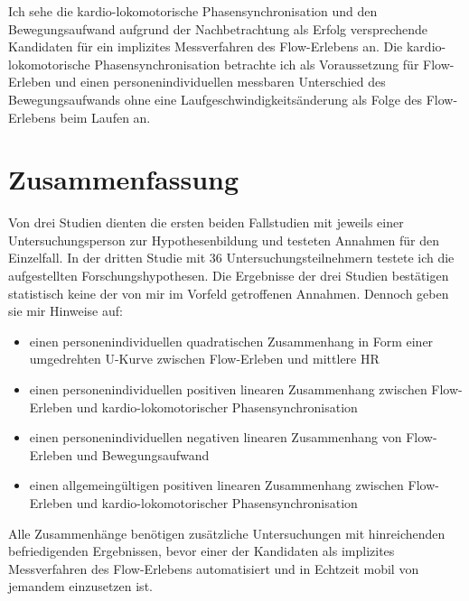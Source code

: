 Ich sehe die kardio-lokomotorische Phasensynchronisation und den Bewegungsaufwand aufgrund der Nachbetrachtung als Erfolg versprechende Kandidaten für ein implizites Messverfahren des Flow-Erlebens an. Die kardio-lokomotorische Phasensynchronisation betrachte ich als Voraussetzung für Flow-Erleben und einen personenindividuellen messbaren Unterschied des Bewegungsaufwands ohne eine Laufgeschwindigkeitsänderung als Folge des Flow-Erlebens beim Laufen an. 

\section{Zusammenfassung}
\label{sec:zusammenfassung_5}

Von drei Studien dienten die ersten beiden Fallstudien mit jeweils einer Untersuchungsperson zur Hypothesenbildung und testeten Annahmen für den Einzelfall. In der dritten Studie mit 36 Untersuchungsteilnehmern testete ich die aufgestellten Forschungshypothesen. Die Ergebnisse der drei Studien bestätigen statistisch keine der von mir im Vorfeld getroffenen Annahmen. Dennoch geben sie mir Hinweise auf:

\begin{itemize}
	\item einen personenindividuellen quadratischen Zusammenhang in Form einer umgedrehten U-Kurve zwischen Flow-Erleben und mittlere HR
	\item einen personenindividuellen positiven linearen Zusammenhang zwischen Flow-Erleben und kardio-lokomotorischer Phasensynchronisation
	\item einen personenindividuellen negativen linearen Zusammenhang von Flow-Erleben und Bewegungsaufwand
	\item einen allgemeingültigen positiven linearen Zusammenhang zwischen Flow-Erleben und kardio-lokomotorischer Phasensynchronisation
\end{itemize}

Alle Zusammenhänge benötigen zusätzliche Untersuchungen mit hinreichenden befriedigenden Ergebnissen, bevor einer der Kandidaten als implizites Messverfahren des Flow-Erlebens automatisiert und in Echtzeit mobil von jemandem einzusetzen ist. 